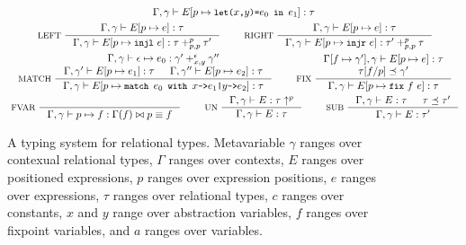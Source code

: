 \begin{figure}
\begin{gather*}
{      \Gamma, \gamma \judges \upd{E}{p}{ \letexp{x}{y}{e_0}{e_1} } : %
      \tau } \\
    \inference[ LEFT ]{
      \Gamma, \gamma \judges \upd{E}{p}{ e } : \tau }{
      \Gamma, \gamma \judges \upd{E}{p}{ \injl\ e} : %
      \tau +_{p, p}^p \tau' } \qquad
    \inference[ RIGHT ]{
      \Gamma, \gamma \judges \upd{E}{p}{ e } : \tau }{
      \Gamma, \gamma \judges \upd{E}{p}{ \injr\ e} : %
      \tau' +_{p, p}^p \tau } \\
    \inference[ MATCH ]{
      \Gamma, \gamma \judges \epsilon \mapsto e_0 : %
      \gamma' +_{x, y}^\epsilon \gamma'' \\
      \Gamma, \gamma' \judges \upd{E}{p}{e_1} : \tau &
      \Gamma, \gamma'' \judges \upd{E}{p}{e_2} : \tau }{
      \Gamma, \gamma \judges %
      \upd{E}{p}{ \matchexp{e_0}{ x }{e_1}{ y }{e_2} } : \tau } \qquad
    \inference[ FIX ]{
      \upd{ \Gamma }{ f }{ \gamma' }, \gamma \judges %
      \upd{ E }{ p }{ e } : \tau \\
      \replace{ \tau }{ p }{ f } \subtype \gamma' }{ %
      \Gamma, \gamma \judges \upd{ E }{ p }{ \fix{f}{e} }: \tau } \\
    \inference[ FVAR ]{ }{
      \Gamma, \gamma \judges p \mapsto f : %
      \Gamma(f) \joinctr p \equiv f} \qquad
    \inference[ UN ]{
      \Gamma, \gamma \judges E : \unfold{\tau}{p} }{ 
      \Gamma, \gamma \judges E : \tau } \qquad
    \inference[ SUB ]{
      \Gamma, \gamma \judges E : \tau &
      \tau \subtype \tau' }{ %
      \Gamma, \gamma \judges E : \tau' }
  \end{gather*}
  \caption{A typing system for relational types.
    Metavariable %
    $\gamma$ ranges over contexual relational types, %
    $\Gamma$ ranges over contexts, %
    $E$ ranges over positioned expressions, %
    $p$ ranges over expression positions, %
    $e$ ranges over expressions, %
    $\tau$ ranges over relational types, %
    $c$ ranges over constants, %
    $x$ and $y$ range over abstraction variables, %
    $f$ ranges over fixpoint variables, and %
    $a$ ranges over variables. }
  \label{fig:reltypes-rules}
\end{figure}

